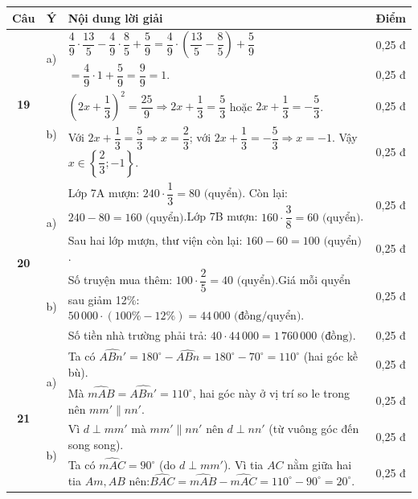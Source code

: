 \documentclass[11pt,a4paper]{article}
\begin{document}
\noindent
\begin{tabularx}{\linewidth}{|c|c|X|c|}
\hline
\textbf{Câu} & \textbf{Ý} & \textbf{Nội dung lời giải} & \textbf{Điểm} \\ \hline
\multirow{4}{*}{\textbf{19}} & \multirow{2}{*}{a)} & $\dfrac{4}{9} \cdot \dfrac{13}{5} - \dfrac{4}{9} \cdot \dfrac{8}{5} + \dfrac{5}{9} = \dfrac{4}{9} \cdot \left(\dfrac{13}{5} - \dfrac{8}{5}\right) + \dfrac{5}{9}$ & 0,25 đ \\ \cline{3-4}
& & $= \dfrac{4}{9} \cdot 1 + \dfrac{5}{9} = \dfrac{9}{9} = 1$. & 0,25 đ \\ \cline{2-4}
& \multirow{2}{*}{b)} & $\left(2x + \dfrac{1}{3}\right)^2 = \dfrac{25}{9} \Rightarrow 2x + \dfrac{1}{3} = \dfrac{5}{3}$ hoặc $2x + \dfrac{1}{3} = -\dfrac{5}{3}$. & 0,25 đ \\ \cline{3-4}
& & Với $2x + \dfrac{1}{3} = \dfrac{5}{3} \Rightarrow x = \dfrac{2}{3}$; với $2x + \dfrac{1}{3} = -\dfrac{5}{3} \Rightarrow x = -1$. Vậy $x \in \left\{\dfrac{2}{3}; -1\right\}$. & 0,25 đ \\ \hline

\multirow{4}{*}{\textbf{20}} & \multirow{2}{*}{a)} & Lớp 7A mượn: $240 \cdot \dfrac{1}{3} = 80\text{ (quyển)}$. Còn lại: $240 - 80 = 160\text{ (quyển)}$.\newline Lớp 7B mượn: $160 \cdot \dfrac{3}{8} = 60\text{ (quyển)}$. & 0,25 đ \\ \cline{3-4}
& & Sau hai lớp mượn, thư viện còn lại: $160 - 60 = 100\text{ (quyển)}$. & 0,25 đ \\ \cline{2-4}
& \multirow{2}{*}{b)} & Số truyện mua thêm: $100 \cdot \dfrac{2}{5} = 40\text{ (quyển)}$.\newline Giá mỗi quyển sau giảm 12\%: $50\,000 \cdot (100\% - 12\%) = 44\,000\text{ (đồng/quyển)}$. & 0,25 đ \\ \cline{3-4}
& & Số tiền nhà trường phải trả: $40 \cdot 44\,000 = 1\,760\,000\text{ (đồng)}$. & 0,25 đ \\ \hline

\multirow{4}{*}{\textbf{21}} & \multirow{2}{*}{a)} & Ta có $\widehat{ABn'} = 180^\circ - \widehat{ABn} = 180^\circ - 70^\circ = 110^\circ$ (hai góc kề bù). & 0,25 đ \\ \cline{3-4}
& & Mà $\widehat{mAB} = \widehat{ABn'} = 110^\circ$, hai góc này ở vị trí so le trong nên $mm' \parallel nn'$. & 0,25 đ \\ \cline{2-4}
& \multirow{2}{*}{b)} & Vì $d \perp mm'$ mà $mm' \parallel nn'$ nên $d \perp nn'$ (từ vuông góc đến song song). & 0,25 đ \\ \cline{3-4}
& & Ta có $\widehat{mAC} = 90^\circ$ (do $d \perp mm'$). Vì tia $AC$ nằm giữa hai tia $Am, AB$ nên:\newline $\widehat{BAC} = \widehat{mAB} - \widehat{mAC} = 110^\circ - 90^\circ = 20^\circ$. & 0,25 đ \\ \hline
\end{tabularx}
\end{document}
